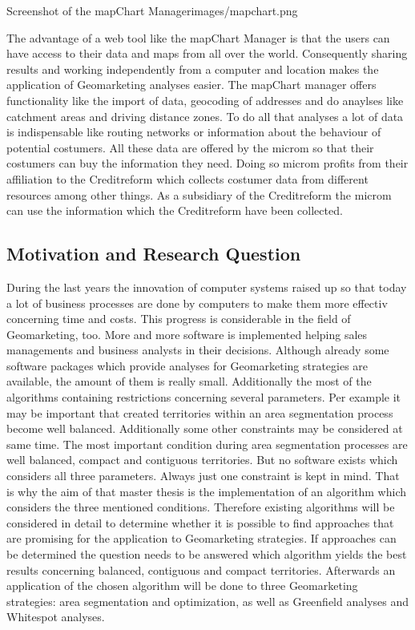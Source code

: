 \begin{figureOwn}{Screenshot of the mapChart Manager}{images/mapchart.png}\end{figureOwn}

The advantage of a web tool like the mapChart Manager is that the users can have access to their data and maps from all over the world. Consequently sharing results and working independently from a computer and location makes the application of Geomarketing analyses easier. The mapChart manager offers functionality like the import of data, geocoding of addresses and do anaylses like catchment areas and driving distance zones. To do all that analyses a lot of data is indispensable  like routing networks or information about the behaviour of potential costumers. All these data are offered by the microm so that their costumers can buy the information they need. Doing so microm profits from their affiliation to the Creditreform which collects costumer data from different resources among other things. As a subsidiary of the Creditreform the microm can use the information which the Creditreform have been collected.

\subsection{Motivation and Research Question}
During the last years the innovation of computer systems raised up so that today a lot of business processes are done by computers to make them more effectiv concerning time and costs. This progress is considerable in the field of Geomarketing, too. More and more software is implemented helping sales managements and business analysts in their decisions. Although already some software packages which provide analyses for Geomarketing strategies are available, the amount of them is really small. Additionally the most of the algorithms containing restrictions concerning several parameters. Per example it may be important that created territories within an area segmentation process become well balanced. Additionally some other constraints may be considered at same time. The most important condition during area segmentation processes are well balanced, compact and contiguous territories. But no software exists which considers all three parameters. Always just one constraint is kept in mind. That is why the aim of that master thesis is the implementation of an algorithm which considers the three mentioned conditions. Therefore existing algorithms will be considered in detail to determine whether it is possible to find approaches that are promising for the application to Geomarketing strategies. If approaches can be determined the question needs to be answered which algorithm yields the best results concerning balanced, contiguous and compact territories. Afterwards an application of the chosen algorithm will be done to three Geomarketing strategies: area segmentation and optimization, as well as Greenfield analyses and Whitespot analyses.

